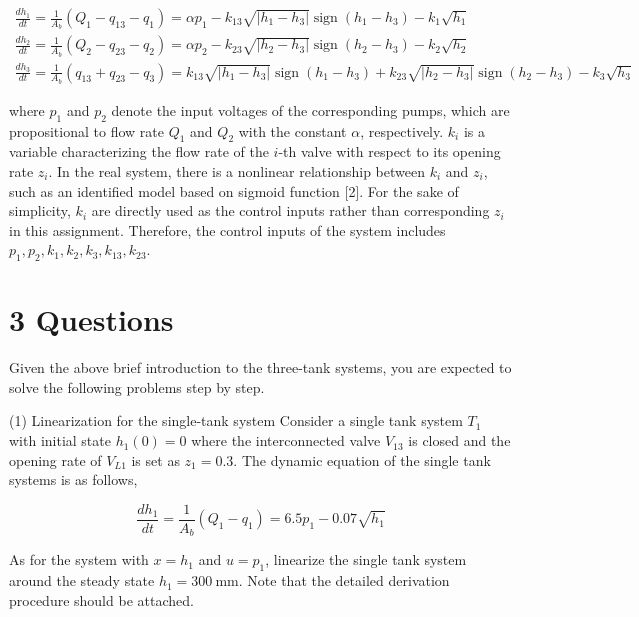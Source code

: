 \documentclass[10pt]{article}
\begin{document}
$$
\begin{gathered}
\frac{d h_{1}}{d t}=\frac{1}{A_{b}}\left(Q_{1}-q_{13}-q_{1}\right)=\alpha p_{1}-k_{13} \sqrt{\left|h_{1}-h_{3}\right|} \operatorname{sign}\left(h_{1}-h_{3}\right)-k_{1} \sqrt{h_{1}} \\
\frac{d h_{2}}{d t}=\frac{1}{A_{b}}\left(Q_{2}-q_{23}-q_{2}\right)=\alpha p_{2}-k_{23} \sqrt{\left|h_{2}-h_{3}\right|} \operatorname{sign}\left(h_{2}-h_{3}\right)-k_{2} \sqrt{h_{2}} \\
\frac{d h_{3}}{d t}=\frac{1}{A_{b}}\left(q_{13}+q_{23}-q_{3}\right)=k_{13} \sqrt{\left|h_{1}-h_{3}\right|} \operatorname{sign}\left(h_{1}-h_{3}\right)+k_{23} \sqrt{\left|h_{2}-h_{3}\right|} \operatorname{sign}\left(h_{2}-h_{3}\right)-k_{3} \sqrt{h_{3}}
\end{gathered}
$$

where $p_{1}$ and $p_{2}$ denote the input voltages of the corresponding pumps, which are propositional to flow rate $Q_{1}$ and $Q_{2}$ with the constant $\alpha$, respectively. $k_{i}$ is a variable characterizing the flow rate of the $i$-th valve with respect to its opening rate $z_{i}$. In the real system, there is a nonlinear relationship between $k_{i}$ and $z_{i}$, such as an identified model based on sigmoid function [2]. For the sake of simplicity, $k_{i}$ are directly used as the control inputs rather than corresponding $z_{i}$ in this assignment. Therefore, the control inputs of the system includes $p_{1}, p_{2}, k_{1}, k_{2}, k_{3}, k_{13}, k_{23}$.

\section*{3 Questions}
Given the above brief introduction to the three-tank systems, you are expected to solve the following problems step by step.

(1) Linearization for the single-tank system Consider a single tank system $T_{1}$ with initial state $h_{1}(0)=0$ where the interconnected valve $V_{13}$ is closed and the opening rate of $V_{L 1}$ is set as $z_{1}=0.3$. The dynamic equation of the single tank systems is as follows,

$$
\frac{d h_{1}}{d t}=\frac{1}{A_{b}}\left(Q_{1}-q_{1}\right)=6.5 p_{1}-0.07 \sqrt{h_{1}}
$$

As for the system with $x=h_{1}$ and $u=p_{1}$, linearize the single tank system around the steady state $h_{1}=300 \mathrm{~mm}$. Note that the detailed derivation procedure should be attached.
\end{document}
